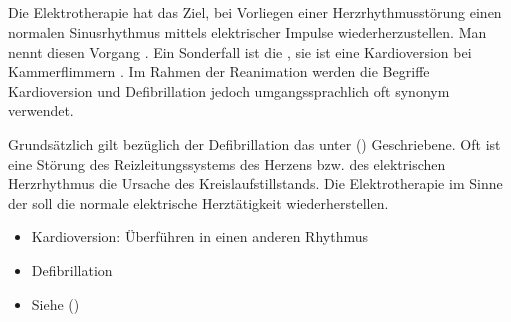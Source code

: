 \subsection{}



\TextSlide{\TxBeschreibung}
{%
Die Elektrotherapie hat das Ziel, 
bei Vorliegen einer Herzrhythmusstörung einen normalen Sinusrhythmus mittels elektrischer Impulse wiederherzustellen. 
%
Man nennt diesen Vorgang  %
. 
%
Ein Sonderfall ist die , sie ist eine Kardioversion bei Kammerflimmern . 
%
Im Rahmen der Reanimation werden die Begriffe Kardioversion und Defibrillation jedoch umgangssprachlich oft synonym verwendet.%

Grundsätzlich gilt bezüglich der Defibrillation das unter  \CO{[BLS]} () Geschriebene. 
%
Oft ist eine Störung des Reizleitungssystems des Herzens bzw. des elektrischen Herzrhythmus die
Ursache des Kreislaufstillstands. 
Die Elektrotherapie im Sinne der  soll die normale elektrische Herztätigkeit wiederherstellen. 
}
{%
\begin{itemize}
  \item Kardioversion: Überführen in einen anderen Rhythmus
  \item Defibrillation
  \item Siehe \CO{[BLS]} ()
\end{itemize}
}



